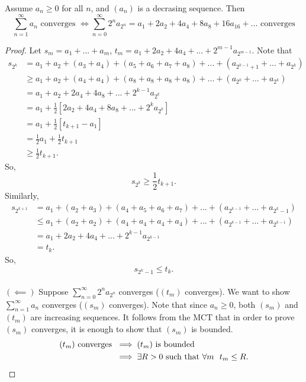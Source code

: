 \begin{theorem}
    Assume $a_n \geq 0$ for all $n$, and $(a_n)$ is a decrasing sequence. Then
    $$\sum_{n=1}^{\infty}a_n \text{ converges } \iff \sum_{n=0}^{\infty}2^n a_{2^n} = a_1 + 2a_2 + 4a_4 + 8a_8 + 16a_{16} +... \text{ converges}$$
\end{theorem}
\begin{proof}\leavevmode
    Let $s_m = a_1 + ... + a_m$, $t_m = a_1 + 2a_2 + 4a_4 + ... + 2^{m-1}a_{2^{m-1}}.$ Note that
    \begin{align*}
        s_{2^k} &= a_1 + a_2 + (a_3 + a_4) + (a_5 + a_6 + a_7 + a_8) +... + (a_{2^{k-1}+1}+...+a_{2^k}) \\
        &\geq a_1 + a_2 + (a_4 + a_4) + (a_8 + a_8 + a_8 + a_8) + ... + (a_{2^k} + ... + a_{2^k}) \\
        &= a_1 + a_2 + 2a_4 + 4a_8 + ... + 2^{k-1}a_{2^k} \\
        &= a_1 + \frac{1}{2}[2a_2 + 4a_4 + 8a_8 + ... + 2^k a_{2^k}] \\
        &= a_1 + \frac{1}{2}[t_{k+1} - a_1] \\
        &=\frac{1}{2}a_1 + \frac{1}{2}t_{k+1} \\
        &\geq \frac{1}{2}t_{k+1}.
    \end{align*}
    So,
    $$s_{2^k} \geq \frac{1}{2}t_{k+1}.$$
    Similarly,
    \begin{align*}
        s_{2^{k+1}} &= a_1 + (a_2 + a_3) +(a_4 + a_5 + a_6 + a_7) +... + (a_{2^{k-1}}+...+a_{2^k -1}) \\
        &\leq a_1 + (a_2 + a_2) + (a_4 + a_4 + a_4 + a_4) + ... + (a_{2^{k-1}} + ... + a_{2^{k-1}}) \\
        &=a_1 + 2a_2 + 4a_4 + ... + 2^{k-1}a_{2^{k-1}} \\
        &=t_k.
    \end{align*}
    So,
    $$s_{2^k -1} \leq t_k.$$
    \\
    $(\impliedby)$ Suppose $\sum_{n=0}^{\infty}2^n a_{2^n}$ converges ($(t_m)$ converges). We want to show $\sum_{n=1}^{\infty}a_n$ converges ($(s_m)$ converges). Note that since $a_n \geq 0$, both $(s_m)$ and $(t_m)$ are increasing sequences. It follows from the MCT that in order to prove $(s_m)$ converges, it is enough to show that $(s_m)$ is bounded.
    \begin{align*}
        (t_m) \text{ converges } &\implies (t_m) \text{ is bounded} \\
        &\implies \exists R > 0 \st \forall m ~~t_m \leq R.

\end{align*}
\end{proof}
